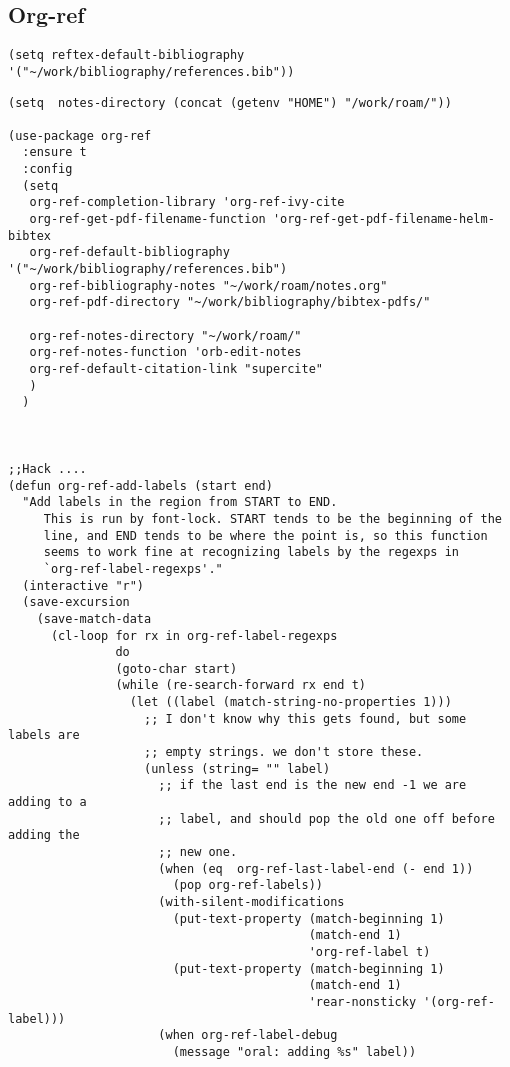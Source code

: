 \documentclass[12pt]{article}
\begin{document}
\subsection{Org-ref}
\label{sec:org762937f}


\begin{verbatim}
(setq reftex-default-bibliography '("~/work/bibliography/references.bib"))

\end{verbatim}


\begin{verbatim}
(setq  notes-directory (concat (getenv "HOME") "/work/roam/"))

(use-package org-ref
  :ensure t 
  :config
  (setq
   org-ref-completion-library 'org-ref-ivy-cite
   org-ref-get-pdf-filename-function 'org-ref-get-pdf-filename-helm-bibtex
   org-ref-default-bibliography '("~/work/bibliography/references.bib")
   org-ref-bibliography-notes "~/work/roam/notes.org"
   org-ref-pdf-directory "~/work/bibliography/bibtex-pdfs/"

   org-ref-notes-directory "~/work/roam/"
   org-ref-notes-function 'orb-edit-notes
   org-ref-default-citation-link "supercite"
   )
  )



;;Hack ....
(defun org-ref-add-labels (start end)
  "Add labels in the region from START to END.
     This is run by font-lock. START tends to be the beginning of the
     line, and END tends to be where the point is, so this function
     seems to work fine at recognizing labels by the regexps in
     `org-ref-label-regexps'."
  (interactive "r")
  (save-excursion
    (save-match-data
      (cl-loop for rx in org-ref-label-regexps
               do
               (goto-char start)
               (while (re-search-forward rx end t)
                 (let ((label (match-string-no-properties 1)))
                   ;; I don't know why this gets found, but some labels are
                   ;; empty strings. we don't store these.
                   (unless (string= "" label)
                     ;; if the last end is the new end -1 we are adding to a
                     ;; label, and should pop the old one off before adding the
                     ;; new one.
                     (when (eq  org-ref-last-label-end (- end 1))
                       (pop org-ref-labels))
                     (with-silent-modifications
                       (put-text-property (match-beginning 1)
                                          (match-end 1)
                                          'org-ref-label t)
                       (put-text-property (match-beginning 1)
                                          (match-end 1)
                                          'rear-nonsticky '(org-ref-label)))
                     (when org-ref-label-debug
                       (message "oral: adding %s" label))


\end{verbatim}
\end{document}
